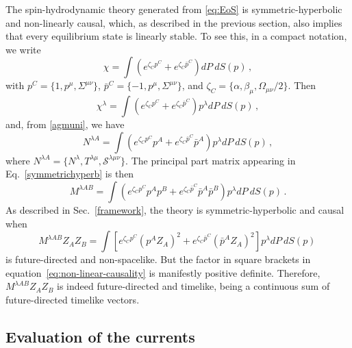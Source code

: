 \documentclass[12pt,aps,prd,nofootinbib,noshowkeys,noshowpacs,longbibliography,
superscriptaddress,tightenlines,floatfix,preprintnumbers]{revtex4-2}
\begin{document}
The spin-hydrodynamic theory generated from \eqref{eq:EoS} is symmetric-hyperbolic and non-linearly causal, which, as described in the previous section, also implies that every equilibrium state is linearly stable. To see this, in a compact notation, we write
\begin{equation}
    \chi = \int  \left(e^{ \zeta_C p^C} + e^{\zeta_C \bar{p}^C}\right) dP\ dS(p)\,,
\end{equation}
with $p^C=\{1, p^\mu,\Sigma^{\mu \nu} \}$, $\bar{p}^C=\{-1,p^\mu,\Sigma^{\mu \nu} \}$, and $\zeta_C=\{\alpha,\beta_\mu,\Omega_{\mu\nu}/2\}$. Then
\begin{equation}
    \chi^\lambda= \int  \left(e^{ \zeta_C p^C} + e^{\zeta_C \bar{p}^C}\right) p^\lambda dP\ dS(p)\, ,
\end{equation}
and, from \eqref{agmuni}, we have
\begin{equation}
    N^{\lambda A}= \int  \left(e^{ \zeta_C p^C} p^A + e^{\zeta_C \bar{p}^C} \bar{p}^A\right) p^\lambda dP\ dS(p)\, ,
    \label{eq:currents}
\end{equation}
where $N^{\lambda A}= \{ N^\lambda, T^{\lambda \mu},\mathcal{S}^{\lambda \mu \nu} \}$.
The principal part matrix appearing in Eq.~\eqref{symmetrichyperb} is then
\begin{equation}
    M^{\lambda AB} = \int  \left(e^{ \zeta_C p^C} p^Ap^B + e^{\zeta_C \bar{p}^C} \bar{p}^A \bar{p}^B\right) p^\lambda dP\ dS(p)\, .
\end{equation}
As described in Sec.~\ref{framework}, the theory is symmetric-hyperbolic and causal when
\begin{equation}
   M^{\lambda AB}Z_A Z_B = \int  \left[ e^{ \zeta_C p^C} (p^AZ_A)^2 + e^{\zeta_C \bar{p}^C} (\bar{p}^AZ_A)^2 \right] p^\lambda dP\ dS(p)\,
   \label{eq:non-linear-causality}
\end{equation}
is future-directed and non-spacelike. But the factor in square brackets in equation~\eqref{eq:non-linear-causality} is manifestly positive definite. Therefore, $M^{\lambda AB}Z_A Z_B$ is indeed future-directed and timelike, being a continuous sum of future-directed timelike vectors.


\subsection{Evaluation of the currents}
\end{document}
